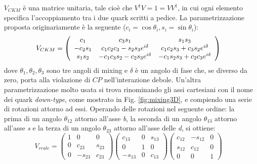 \documentclass{subnucbo}
\begin{document}
$V_{CKM}$ è una matrice unitaria, tale cioè che $V ^ { \dagger } V = 1 = V V ^ { \dagger }$, in cui ogni elemento specifica l'accoppiamento tra i due quark scritti a pedice. La parametrizzazione proposta originariamente è la seguente ($c_{i}=\cos\theta_{i}, s_{i}=\sin\theta_{i}$):
\begin{equation}
V _ { C K M } = \left( \begin{array} { c c c } { c _ { 1 } } & { c _ { 3 } s _ { 1 } } & { s _ { 1 } s _ { 3 } } \\ { - c _ { 2 } s _ { 1 } } & { c _ { 1 } c _ { 2 } c _ { 3 } - s _ { 2 } s _ { 3 } e ^ { i \delta } } & { c _ { 1 } c _ { 2 } s _ { 3 } + c _ { 3 } s _ { 2 } e ^ { i \delta } } \\ { s _ { 1 } s _ { 2 } } & { - c _ { 1 } c _ { 3 } s _ { 2 } - c _ { 2 } s _ { 3 } e ^ { i \delta }} & {- c _ { 1 } s _ { 2 } s _ { 3 } + c _ { 2 } c _ { 3 } e ^ { i \delta } } \end{array} \right)
        \label{eq:ckm_param}
\end{equation}
dove $\theta _ { 1 } , \theta _ { 2 } , \theta _ { 3 }$ sono tre angoli di mixing e $\delta$ è un angolo di fase che, se diverso da zero, porta alla violazione di $CP$ nell'interazione debole. Un'altra parametrizzazione molto usata si trova rinominando gli assi cartesiani con il nome dei quark \textit{down-type}, come mostrato in Fig. \ref{fig:mixing3D}, e compiendo una serie di rotazioni attorno ad essi. Operando delle rotazioni nel seguente ordine: la prima di un angolo $\theta_{12}$ attorno all'asse \textit{b}, la seconda di un angolo $\theta_{13}$ attorno all'asse \textit{s} e la terza di un angolo $\theta_{23}$ attorno all'asse delle \textit{d}, si ottiene:
\begin{equation}
        V_{reale}=
        \begin{pmatrix}1 & 0 & 0\\0 & c_{23} & s_{23}\\0 & -s_{23} & c_{23}\end{pmatrix}
        \begin{pmatrix}c_{13} & 0 & s_{13}\\0 & 1 & 0\\-s_{13} & 0 & c_{13}\end{pmatrix}
        \begin{pmatrix}c_{12} & -s_{12} & 0\\s_{12} & c_{12} & 0\\0 & 0 & 1\end{pmatrix}
        \label{eq:CKMsencos}
\end{equation}
\end{document}
